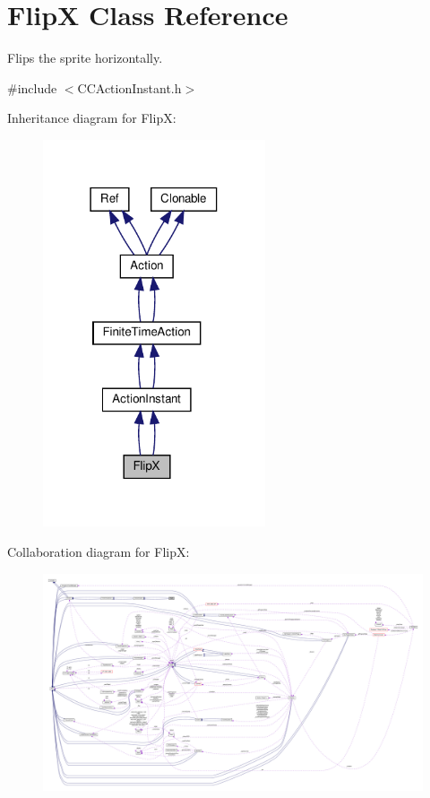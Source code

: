 \hypertarget{classFlipX}{}\section{FlipX Class Reference}
\label{classFlipX}


Flips the sprite horizontally.  




{\ttfamily \#include $<$C\+C\+Action\+Instant.\+h$>$}



Inheritance diagram for FlipX\+:
\nopagebreak
\begin{figure}[H]
\begin{center}
\leavevmode
\includegraphics[width=186pt]{classFlipX__inherit__graph}
\end{center}
\end{figure}


Collaboration diagram for FlipX\+:
\nopagebreak
\begin{figure}[H]
\begin{center}
\leavevmode
\includegraphics[width=350pt]{classFlipX__coll__graph}
\end{center}
\end{figure}
